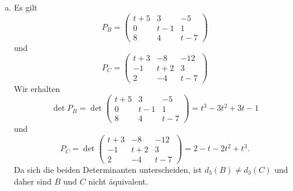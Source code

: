 \documentclass{article}
\theoremstyle{definition}
\begin{document}
\begin{enumerate}[(a)]
\begin{align*}
\begin{gmatrix}[p]
			0 & 0& -\frac{3}{2}(t-2) & -(t-2)(t-2)\\
			0 & 0& -\frac{1}{6}(1+t)(t-2) & 0
			\rowops
			\add[-\frac{1}{9}(t+1)]{2}{3}
		\end{gmatrix}
		&\rightsquigarrow \begin{gmatrix}[p]
			1 & 0 & 0 & 0\\
			0 & 6 & 0 & 0\\
			0 & 0& -\frac{3}{2}(t-2) & -(t-2)^2\\
			0 & 0& 0 & \frac{1}{9}(t-2)^2(t+1)
			\colops
			\add[-\frac{2}{3}(t-2)]{2}{3}
		\end{gmatrix}\\
		\rightsquigarrow \begin{gmatrix}[p]
			1 & 0 & 0 & 0\\
			0 & 6 & 0 & 0\\
			0 & 0& -\frac{3}{2}(t-2) & 0\\
			0 & 0& 0 & \frac{1}{9}(t-2)^2(t+1)
			\rowops
			\mult{1}{\cdot \frac{1}{6}}
			\mult{2}{\cdot \frac{2}{3}}
			\mult{3}{\cdot 9}
		\end{gmatrix}
		&\rightsquigarrow \begin{gmatrix}[p]
			1 & 0 & 0 & 0\\
			0 & 1 & 0 & 0\\
			0 & 0& (t-2) & 0\\
			0 & 0& 0 & (t-2)^2(t+1)
		\end{gmatrix}
	\end{align*}
	Damit erhalten wir die Invariantenteiler $1, 1, (t-2)$ und $(t-2)^2(t+1)$. Die Determinantenteiler lauten folglich $1, 1, (t-2)$ und $(t-2)^3 (t+1)$.
	\item Es gilt $$P_B = \begin{pmatrix}
		t + 5 & 3 & -5\\
		0 & t-1 & 1\\
		8 & 4 & t - 7
	\end{pmatrix}$$ und $$P_C = \begin{pmatrix}
		t + 3 & - 8 & - 12\\
		- 1 & t + 2 & 3\\
		2 & - 4 & t-7
	\end{pmatrix}$$ Wir erhalten $$\det P_B = \det \begin{pmatrix}
		t + 5 & 3 & -5\\
		0 & t-1 & 1\\
		8 & 4 & t - 7
	\end{pmatrix} = t^3 - 3t^2 + 3t - 1$$ und $$P_C = \det \begin{pmatrix}
		t + 3 & - 8 & - 12\\
		- 1 & t + 2 & 3\\
		2 & - 4 & t-7
	\end{pmatrix} = 2 - t - 2 t^2 + t^3.$$ Da sich die beiden Determinanten unterscheiden, ist $d_3(B) \neq d_3(C)$ und daher sind $B$ und $C$ nicht äquivalent.
\end{enumerate}
\end{document}
